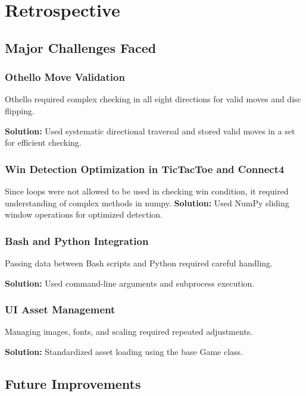 \documentclass[12pt,a4paper]{article}
\begin{document}
\section{Retrospective}

\subsection{Major Challenges Faced}

\subsubsection{Othello Move Validation}

Othello required complex checking in all eight directions for valid moves and disc flipping.

\textbf{Solution:} Used systematic directional traversal and stored valid moves in a set for efficient checking.

\subsubsection{Win Detection Optimization in TicTacToe and Connect4}
Since loops were not allowed to be used in checking win condition, it required understanding of complex methods in numpy.
\textbf{Solution:} Used NumPy sliding window operations for optimized detection.

\subsubsection{Bash and Python Integration}

Passing data between Bash scripts and Python required careful handling.

\textbf{Solution:} Used command-line arguments and subprocess execution.

\subsubsection{UI Asset Management}

Managing images, fonts, and scaling required repeated adjustments.

\textbf{Solution:} Standardized asset loading using the base Game class.

\subsection{Future Improvements}
\end{document}
